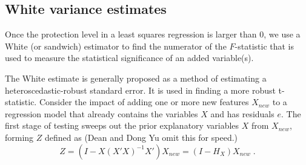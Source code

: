 \documentclass[12pt]{article}
\begin{document}
\subsection{White variance estimates} %

 Once the protection level in a least squares regression is larger than 0, we
 use a White (or sandwich) estimator to find the numerator of the $F$-statistic
 that is used to measure the statistical significance of an added variable(s).

 The White estimate is generally proposed as a method of estimating a
 heteroscedastic-robust standard error.  It is used in finding a more robust
 t-statistic.  Consider the impact of adding one or more new features $X_{new}$
 to a regression model that already contains the variables $X$ and has residuals
 $e$. The first stage of testing sweeps out the prior explanatory variables $X$
 from $X_{new}$, forming $Z$ defined as (Dean and Dong Yu omit this for speed.)
\begin{displaymath}
  Z = (I-X(X'X)^{-1}X') X_{new} = (I-H_X) X_{new}  \;.
\end{displaymath}
\end{document}
